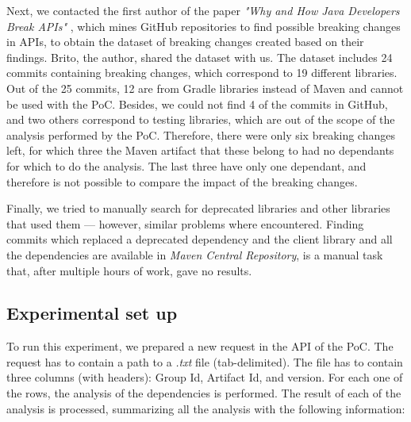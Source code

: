 Next, we contacted the first author of the paper \textit{"Why and How Java Developers Break APIs"} \cite{Brito2018}, which mines GitHub repositories to find possible breaking changes in APIs, to obtain the dataset of breaking changes created based on their findings. Brito, the author, shared the dataset with us. The dataset includes 24 commits containing breaking changes, which correspond to 19 different libraries. Out of the 25 commits, 12 are from Gradle libraries instead of Maven and cannot be used with the PoC. Besides, we could not find 4 of the commits in GitHub, and two others correspond to testing libraries, which are out of the scope of the analysis performed by the PoC. Therefore, there were only six breaking changes left, for which three the Maven artifact that these belong to had no dependants for which to do the analysis. The last three have only one dependant, and therefore is not possible to compare the impact of the breaking changes.

Finally, we tried to manually search for deprecated libraries and other libraries that used them — however, similar problems where encountered. Finding commits which replaced a deprecated dependency and the client library and all the dependencies are available in \textit{Maven Central Repository}, is a manual task that, after multiple hours of work, gave no results.

\subsection{Experimental set up}
To run this experiment, we prepared a new request in the API of the PoC. The request has to contain a path to a \textit{.txt} file (tab-delimited). The file has to contain three columns (with headers): Group Id, Artifact Id, and version. For each one of the rows, the analysis of the dependencies is performed. The result of each of the analysis is processed, summarizing all the analysis with the following information:

